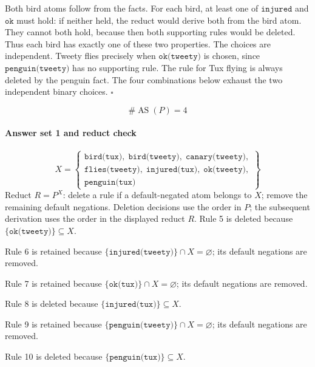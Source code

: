 \documentclass[a4paper,11pt]{article}
\newif\ifexplain
\newcommand{\explain}[1]{\ifexplain\begin{erklbox}#1\end{erklbox}\fi}
\newcommand{\at}[1]{\texttt{#1}}
\begin{document}
Both bird atoms follow from the facts. For each bird, at least one of $\at{injured}$ and $\at{ok}$ must hold: if neither held, the reduct would derive both from the bird atom. They cannot both hold, because then both supporting rules would be deleted. Thus each bird has exactly one of these two properties. The choices are independent. Tweety flies precisely when $\at{ok(tweety)}$ is chosen, since $\at{penguin(tweety)}$ has no supporting rule. The rule for Tux flying is always deleted by the penguin fact. The four combinations below exhaust the two independent binary choices. $\square$
\explain{Zuerst klären wir, welche Kombinationen überhaupt möglich sind. Gegenseitige Default-Negation lässt genau eine der beiden Eigenschaften zu. Eine Regel mit \texttt{not p} und Kopf $p$ kann einen Fall ausschließen, statt einfach $p$ zu einer stabilen Lösung hinzuzufügen. Die Redukt-Proben darunter prüfen jede verbliebene Kombination einzeln.}
\[
\boxed{\#\operatorname{AS}(P)=4}
\]
\paragraph{Answer set 1 and reduct check}
\[
X=\left\{\begin{gathered}\at{bird(tux)},\;\at{bird(tweety)},\;\at{canary(tweety)},\\\at{flies(tweety)},\;\at{injured(tux)},\;\at{ok(tweety)},\\\at{penguin(tux)}\end{gathered}\right\}
\]
Reduct $R=P^X$: delete a rule if a default-negated atom belongs to $X$; remove the remaining default negations. Deletion decisions use the order in $P$; the subsequent derivation uses the order in the displayed reduct $R$.
Rule 5 is deleted because $\{\at{ok(tweety)}\}\subseteq X$.

Rule 6 is retained because $\{\at{injured(tweety)}\}\cap X=\varnothing$; its default negations are removed.

Rule 7 is retained because $\{\at{ok(tux)}\}\cap X=\varnothing$; its default negations are removed.

Rule 8 is deleted because $\{\at{injured(tux)}\}\subseteq X$.

Rule 9 is retained because $\{\at{penguin(tweety)}\}\cap X=\varnothing$; its default negations are removed.

Rule 10 is deleted because $\{\at{penguin(tux)}\}\subseteq X$.
\end{document}
